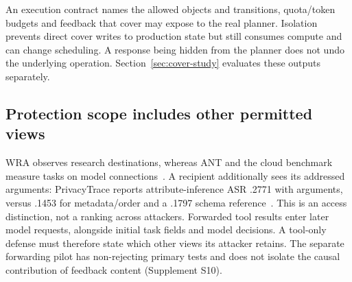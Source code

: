 An execution contract names the allowed objects and transitions, quota/token budgets and feedback that cover may expose to the real planner. Isolation prevents direct cover writes to production state but still consumes compute and can change scheduling. A response being hidden from the planner does not undo the underlying operation. Section~\ref{sec:cover-study} evaluates these outputs separately.

\subsection{Protection scope includes other permitted views}\label{sec:crosslink}
WRA observes research destinations, whereas ANT and the cloud benchmark measure tasks on model connections~\cite{jeong2026wra,li2026ant,pouryousef2026traffic}. A recipient additionally sees its addressed arguments: PrivacyTrace reports attribute-inference ASR .2771 with arguments, versus .1453 for metadata/order and a .1797 schema reference~\cite{duan2026privacytrace}. This is an access distinction, not a ranking across attackers. Forwarded tool results enter later model requests, alongside initial task fields and model decisions. A tool-only defense must therefore state which other views its attacker retains. The separate forwarding pilot has non-rejecting primary tests and does not isolate the causal contribution of feedback content (Supplement S10).
